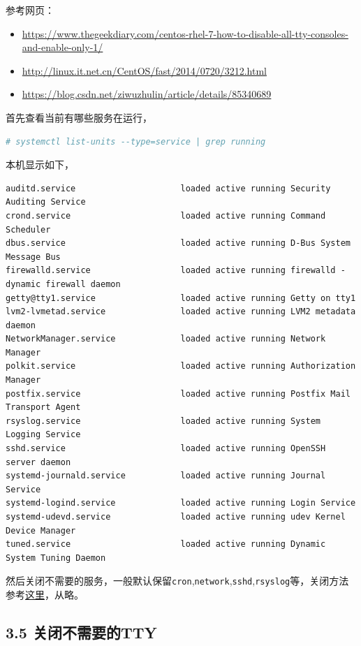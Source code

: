 \documentclass[doctor,openright,twoside]{sjtuthesis}
\providecommand{\tightlist}{%
    \setlength{\itemsep}{0pt}\setlength{\parskip}{0pt}}
\newcommand{\passthrough}[1]{#1}
\theoremstyle{plain}
\theoremstyle{definition}
\theoremstyle{remark}
\theoremstyle{ocrenumbox}
\theoremstyle{plain}
\begin{document}
参考网页：

\begin{itemize}
\tightlist
\item
  \url{https://www.thegeekdiary.com/centos-rhel-7-how-to-disable-all-tty-consoles-and-enable-only-1/}
\item
  \url{http://linux.it.net.cn/CentOS/fast/2014/0720/3212.html}
\item
  \url{https://blog.csdn.net/ziwuzhulin/article/details/85340689}
\end{itemize}

首先查看当前有哪些服务在运行，

\begin{lstlisting}[language=bash]
# systemctl list-units --type=service | grep running
\end{lstlisting}

本机显示如下，

\begin{lstlisting}
auditd.service                     loaded active running Security Auditing Service
crond.service                      loaded active running Command Scheduler
dbus.service                       loaded active running D-Bus System Message Bus
firewalld.service                  loaded active running firewalld - dynamic firewall daemon
getty@tty1.service                 loaded active running Getty on tty1
lvm2-lvmetad.service               loaded active running LVM2 metadata daemon
NetworkManager.service             loaded active running Network Manager
polkit.service                     loaded active running Authorization Manager
postfix.service                    loaded active running Postfix Mail Transport Agent
rsyslog.service                    loaded active running System Logging Service
sshd.service                       loaded active running OpenSSH server daemon
systemd-journald.service           loaded active running Journal Service
systemd-logind.service             loaded active running Login Service
systemd-udevd.service              loaded active running udev Kernel Device Manager
tuned.service                      loaded active running Dynamic System Tuning Daemon
\end{lstlisting}

然后关闭不需要的服务，一般默认保留\passthrough{\lstinline!cron!},\passthrough{\lstinline!network!},\passthrough{\lstinline!sshd!},\passthrough{\lstinline!rsyslog!}等，关闭方法参考\href{https://blog.csdn.net/ziwuzhulin/article/details/85340689}{这里}，从略。

\hypertarget{tty}{%
\subsection{3.5 关闭不需要的TTY}\label{tty}}
\end{document}
